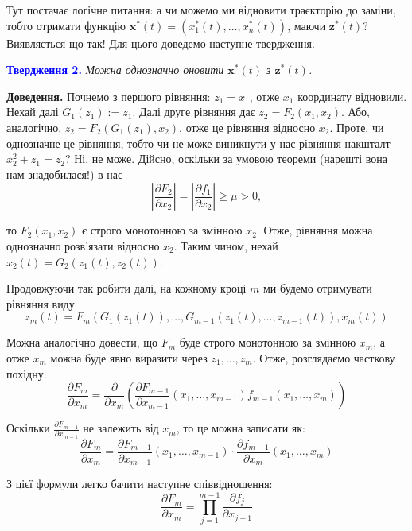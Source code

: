\documentclass[oneside,solution]{karazin-control-assign}
\begin{document}
Тут постачає логічне питання: а чи можемо ми відновити траєкторію до заміни, тобто отримати функцію $\mathbf{x}^*(t) = (x_1^*(t),\dots,x_n^*(t))$, маючи $\mathbf{z}^*(t)$? Виявляється що так! Для цього доведемо наступне твердження.

\textcolor{blue}{\textbf{Твердження 2.}} \textit{Можна однозначно оновити $\mathbf{x}^*(t)$ з $\mathbf{z}^*(t)$.}

\textbf{Доведення.} Почнемо з першого рівняння: $z_1=x_1$, отже $x_1$ координату відновили. Нехай далі $G_1(z_1):=z_1$. Далі друге рівняння дає $z_2=F_2(x_1,x_2)$. Або, аналогічно, $z_2=F_2(G_1(z_1), x_2)$, отже це рівняння відносно $x_2$. Проте, чи однозначне це рівняння, тобто чи не може виникнути у нас рівняння накшталт $x_2^2 + z_1 = z_2$? Ні, не може. Дійсно, оскільки за умовою теореми (нарешті вона нам знадобилася!) в нас
\begin{equation}
    \left|\frac{\partial F_2}{\partial x_2}\right| = \left|\frac{\partial f_1}{\partial x_2}\right| \geq \mu > 0,
\end{equation}

то $F_2(x_1,x_2)$ є строго монотонною за змінною $x_2$. Отже, рівняння можна однозначно розв'язати відносно $x_2$. Таким чином, нехай $x_2(t)=G_2(z_1(t), z_2(t))$. 

Продовжуючи так робити далі, на кожному кроці $m$ ми будемо отримувати рівняння виду
\begin{equation}
    z_m(t) = F_m(G_1(z_1(t)), \dots, G_{m-1}(z_1(t),\dots,z_{m-1}(t)), x_m(t))
\end{equation}

Можна аналогічно довести, що $F_m$ буде строго монотонною за змінною $x_m$, а отже $x_m$ можна буде явно виразити через $z_1,\dots,z_m$. Отже, розглядаємо часткову похідну:
\begin{equation}
    \frac{\partial F_{m}}{\partial x_m} = \frac{\partial}{\partial x_m}\left(\frac{\partial F_{m-1}}{\partial x_{m-1}}(x_1,\dots,x_{m-1})f_{m-1}(x_1,\dots,x_m)\right)
\end{equation}

Оскільки $\frac{\partial F_{m-1}}{\partial x_{m-1}}$ не залежить від $x_m$, то це можна записати як:
\begin{equation}
    \frac{\partial F_{m}}{\partial x_m} = \frac{\partial F_{m-1}}{\partial x_{m-1}}(x_1,\dots,x_{m-1}) \cdot \frac{\partial f_{m-1}}{\partial x_m}(x_1,\dots,x_m)
\end{equation}

З цієї формули легко бачити наступне співвідношення:
\begin{equation}
    \frac{\partial F_m}{\partial x_m} = \prod_{j=1}^{m-1} \frac{\partial f_j}{\partial x_{j+1}}
\end{equation}
\end{document}
